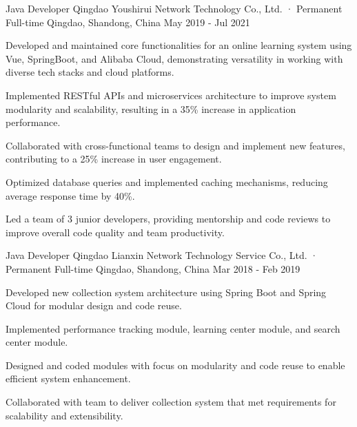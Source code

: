 \begin{cventries}
  \cventry
  {Java Developer} %
  {Qingdao Youshirui Network Technology Co., Ltd. · Permanent Full-time} %
  {Qingdao, Shandong, China} %
  {May 2019 - Jul 2021} %
  {
    \begin{cvitems} %
      \item {Developed and maintained core functionalities for an online learning system using Vue, SpringBoot, and Alibaba Cloud, demonstrating versatility in working with diverse tech stacks and cloud platforms.}
      \item {Implemented RESTful APIs and microservices architecture to improve system modularity and scalability, resulting in a 35\% increase in application performance.}
      \item {Collaborated with cross-functional teams to design and implement new features, contributing to a 25\% increase in user engagement.}
      \item {Optimized database queries and implemented caching mechanisms, reducing average response time by 40\%.}
      \item {Led a team of 3 junior developers, providing mentorship and code reviews to improve overall code quality and team productivity.}
    \end{cvitems}
  }

  \vspace{5mm}
  \cventry
  {Java Developer} %
  {Qingdao Lianxin Network Technology Service Co., Ltd. · Permanent Full-time} %
  {Qingdao, Shandong, China} %
  {Mar 2018 - Feb 2019} %
  {
    \begin{cvitems} %
      \item {Developed new collection system architecture using Spring Boot and Spring Cloud for modular design and code reuse.}
      \item {Implemented performance tracking module, learning center module, and search center module.}
      \item {Designed and coded modules with focus on modularity and code reuse to enable efficient system enhancement.}
      \item {Collaborated with team to deliver collection system that met requirements for scalability and extensibility.}
    \end{cvitems}
  }

\end{cventries}
